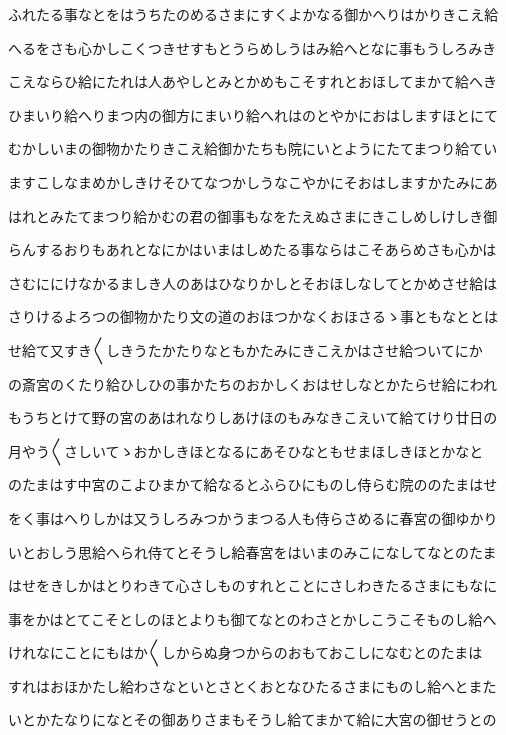 \documentclass[a4paper,11pt,landscape]{ltjtarticle}
\begin{document}
ふれたる事なとをはうちたのめるさまにすくよかなる御かへりはかりきこえ給
\par\medskip
へるをさも心かしこくつきせすもとうらめしうはみ給へとなに事もうしろみき
\par\medskip
こえならひ給にたれは人あやしとみとかめもこそすれとおほしてまかて給へき
\par\medskip
ひまいり給へりまつ内の御方にまいり給へれはのとやかにおはしますほとにて
\par\medskip
むかしいまの御物かたりきこえ給御かたちも院にいとようにたてまつり給てい
\par\medskip
ますこしなまめかしきけそひてなつかしうなこやかにそおはしますかたみにあ
\par\medskip
はれとみたてまつり給かむの君の御事もなをたえぬさまにきこしめしけしき御
\par\medskip
らんするおりもあれとなにかはいまはしめたる事ならはこそあらめさも心かは
\par\medskip
さむににけなかるましき人のあはひなりかしとそおほしなしてとかめさせ給は
\par\medskip
さりけるよろつの御物かたり文の道のおほつかなくおほさるゝ事ともなととは
\par\medskip
せ給て又すき〱しきうたかたりなともかたみにきこえかはさせ給ついてにか
\par\medskip
の斎宮のくたり給ひしひの事かたちのおかしくおはせしなとかたらせ給にわれ
\par\medskip
もうちとけて野の宮のあはれなりしあけほのもみなきこえいて給てけり廿日の
\par\medskip
月やう〱さしいてゝおかしきほとなるにあそひなともせまほしきほとかなと
\par\medskip
のたまはす中宮のこよひまかて給なるとふらひにものし侍らむ院ののたまはせ
\par\medskip
をく事はへりしかは又うしろみつかうまつる人も侍らさめるに春宮の御ゆかり
\par\medskip
いとおしう思給へられ侍てとそうし給春宮をはいまのみこになしてなとのたま
\par\medskip
はせをきしかはとりわきて心さしものすれとことにさしわきたるさまにもなに
\par\medskip
事をかはとてこそとしのほとよりも御てなとのわさとかしこうこそものし給へ
\par\medskip
けれなにことにもはか〱しからぬ身つからのおもておこしになむとのたまは
\par\medskip
すれはおほかたし給わさなといとさとくおとなひたるさまにものし給へとまた
\par\medskip
いとかたなりになとその御ありさまもそうし給てまかて給に大宮の御せうとの
\end{document}
